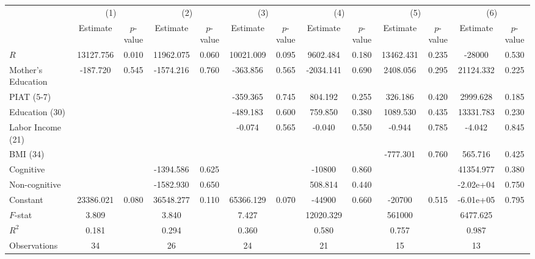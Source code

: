 
\begin{tabular}{lcccccccccccc} \toprule
 & \multicolumn{2}{c}{(1)}  &  \multicolumn{2}{c}{(2)}  &  \multicolumn{2}{c}{(3)}  &  \multicolumn{2}{c}{(4)}  & \multicolumn{2}{c}{(5)} & \multicolumn{2}{c}{(6)} \\  
 & Estimate & $p$-value & Estimate & $p$-value & Estimate & $p$-value & Estimate & $p$-value & Estimate & $p$-value & Estimate & $p$-value \\ \midrule
$R$ & 13127.756 &     0.010 & 11962.075 &     0.060 & 10021.009 &     0.095 &  9602.484 &     0.180 & 13462.431 &     0.235 & -28000 &     0.530 \\  
Mother's Education &  -187.720 &     0.545 & -1574.216 &     0.760 &  -363.856 &     0.565 & -2034.141 &     0.690 &  2408.056 &     0.295 & 21124.332 &     0.225 \\  
PIAT (5-7) &         &         &         &         &  -359.365 &     0.745 &   804.192 &     0.255 &   326.186 &     0.420 &  2999.628 &     0.185 \\  
Education (30) &         &         &         &         &  -489.183 &     0.600 &   759.850 &     0.380 &  1089.530 &     0.435 & 13331.783 &     0.230 \\  
Labor Income (21) &         &         &         &         &    -0.074 &     0.565 &    -0.040 &     0.550 &    -0.944 &     0.785 &    -4.042 &     0.845 \\  
BMI (34) &         &         &         &         &         &         &         &         &  -777.301 &     0.760 &   565.716 &     0.425 \\  
Cognitive &         &         & -1394.586 &     0.625 &         &         & -10800 &     0.860 &         &         & 41354.977 &     0.380 \\  
Non-cognitive &         &         & -1582.930 &     0.650 &         &         &   508.814 &     0.440 &         &         & -2.02e+04 &     0.750 \\  
Constant & 23386.021 &     0.080 & 36548.277 &     0.110 & 65366.129 &     0.070 & -44900 &     0.660 & -20700 &     0.515 & -6.01e+05 &     0.795 \\ \midrule 
$F$-stat &     3.809 &         &     3.840 &         &     7.427 &         & 12020.329 &         &  561000 &         &  6477.625 &         \\  
$R^2$ &     0.181 &         &     0.294 &         &     0.360 &         &     0.580 &         &     0.757 &         &     0.987 &         \\  
Observations &    34 &         &    26 &         &    24 &         &    21 &         &    15 &         &    13 &         \\  
\bottomrule \end{tabular}
